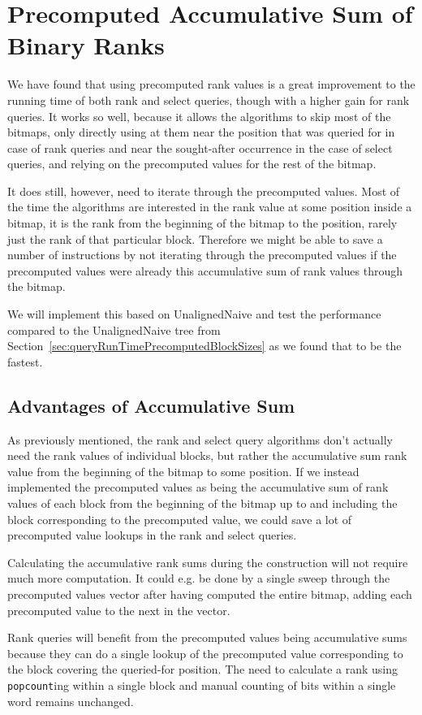 \section{Precomputed Accumulative Sum of Binary Ranks}
We have found that using precomputed rank values is a great improvement to the running time of both rank and select queries, though with a higher gain for rank queries.
It works so well, because it allows the algorithms to skip most of the bitmaps, only directly using at them near the position that was queried for in case of rank queries and near the sought-after occurrence in the case of select queries, and relying on the precomputed values for the rest of the bitmap.

It does still, however, need to iterate through the precomputed values.
Most of the time the algorithms are interested in the rank value at some position inside a bitmap, it is the rank from the beginning of the bitmap to the position, rarely just the rank of that particular block.
Therefore we might be able to save a number of instructions by not iterating through the precomputed values if the precomputed values were already this accumulative sum of rank values through the bitmap.

We will implement this based on UnalignedNaive and test the performance compared to the UnalignedNaive tree from Section~\ref{sec:queryRunTimePrecomputedBlockSizes} as we found that to be the fastest.

\subsection{Advantages of Accumulative Sum}
As previously mentioned, the rank and select query algorithms don't actually need the rank values of individual blocks, but rather the accumulative sum rank value from the beginning of the bitmap to some position.
If we instead implemented the precomputed values as being the accumulative sum of rank values of each block from the beginning of the bitmap up to and including the block corresponding to the precomputed value, we could save a lot of precomputed value lookups in the rank and select queries.

Calculating the accumulative rank sums during the construction will not require much more computation.
It could e.g. be done by a single sweep through the precomputed values vector after having computed the entire bitmap, adding each precomputed value to the next in the vector.

Rank queries will benefit from the precomputed values being accumulative sums because they can do a single lookup of the precomputed value corresponding to the block covering the queried-for position.
The need to calculate a rank using \texttt{popcount}ing within a single block and manual counting of bits within a single word remains unchanged.

